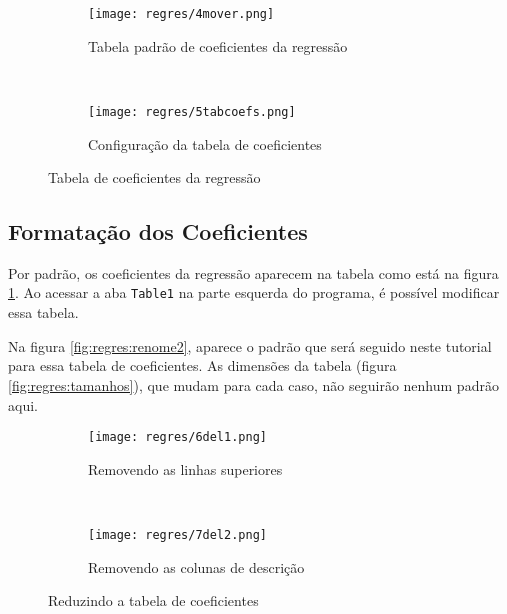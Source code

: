     \begin{figure}[htbp]
        \centering
        \begin{subfigure}{0.45\textwidth}
            \centering
            \texttt{[image: regres/4mover.png]}

            \caption{Tabela padrão de coeficientes da regressão}
            \label{fig:regres:coefspadrao}
        \end{subfigure}
        ~
        \begin{subfigure}{0.50\textwidth}
            \centering
            \texttt{[image: regres/5tabcoefs.png]}

            \caption{Configuração da tabela de coeficientes}
            \label{fig:regres:tabcoefs}
        \end{subfigure}
        \caption{Tabela de coeficientes da regressão}
        \label{fig:regres:coefs}
    \end{figure}


\subsection{Formatação dos Coeficientes}

    Por padrão, os coeficientes da regressão aparecem na tabela como está na figura \ref{fig:regres:coefspadrao}. Ao acessar a aba \texttt{Table1} na parte esquerda do programa, é possível modificar essa tabela.

    Na figura \ref{fig:regres:renome2}, aparece o padrão que será seguido neste tutorial para essa tabela de coeficientes. As dimensões da tabela (figura \ref{fig:regres:tamanhos}), que mudam para cada caso, não seguirão nenhum padrão aqui.

    \begin{figure}[htbp]
        \centering
        \begin{subfigure}{0.45\textwidth}
            \centering
            \texttt{[image: regres/6del1.png]}

            \caption{Removendo as linhas superiores}
            \label{fig:regres:del1}
        \end{subfigure}
        ~
        \begin{subfigure}{0.450\textwidth}
            \centering
            \texttt{[image: regres/7del2.png]}

            \caption{Removendo as colunas de descrição}
            \label{fig:regres:del2}
        \end{subfigure}
        \caption{Reduzindo a tabela de coeficientes}
        \label{fig:regres:del}
    \end{figure}


